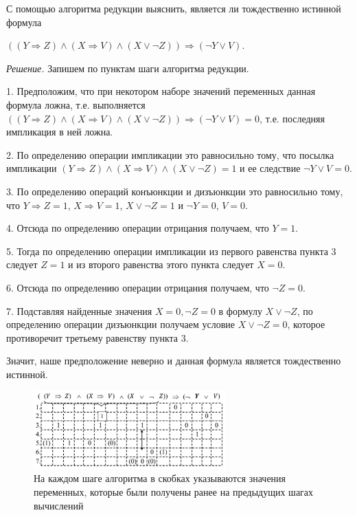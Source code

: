 \begin{example}
    С помощью алгоритма редукции выяснить, является ли тождественно истинной формула

    $((Y\Rightarrow Z)\land(X\Rightarrow V)\land(X\lor\lnot Z))\Rightarrow(\lnot Y\lor V)$.
    
    \textit{Решение.} Запишем по пунктам шаги алгоритма редукции.

    1. Предположим, что при некотором наборе значений переменных данная формула ложна, т.е. выполняется
$((Y\Rightarrow Z)\land(X\Rightarrow V)\land(X\lor\lnot Z))\Rightarrow(\lnot Y\lor V) = 0$, т.е. последняя импликация в ней ложна.

    2. По определению операции импликации это равносильно тому, что посылка импликации $(Y\Rightarrow Z)\land(X\Rightarrow V)\land(X\lor\lnot Z) = 1$ и ее следствие $\lnot Y\lor V = 0$.

    3. По определению операций конъюнкции и дизъюнкции это равносильно тому, что $Y\Rightarrow Z = 1$, $X\Rightarrow V = 1$, $X\lor\lnot Z = 1$ и $\lnot Y = 0$, $V = 0$.

    4. Отсюда по определению операции отрицания получаем, что $Y = 1$.
    
    5. Тогда по определению операции импликации из первого равенства пункта 3 следует $Z = 1$ и из второго равенства этого пункта следует $X = 0$.

    6. Отсюда по определению операции отрицания получаем, что $\lnot Z = 0$.

    7. Подставляя найденные значения $X = 0,\lnot Z = 0$ в формулу $X\lor\lnot Z$, по определению операции дизъюнкции получаем условие $X\lor\lnot Z = 0$, которое противоречит третьему равенству пункта 3.

    Значит, наше предположение неверно и данная формула является тождественно истинной.
\end{example}

\begin{figure}[H]
    \centering
    \includegraphics[height = 3cm]{images/reducto.jpg}
    \caption{На каждом шаге алгоритма в скобках указываются значения переменных, которые были получены ранее на предыдущих шагах вычислений}
\end{figure}

